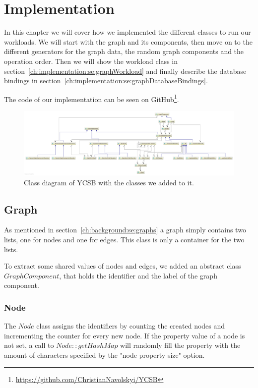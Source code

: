 \chapter{Implementation}
\label{ch:implementation}
In this chapter we will cover how we implemented the different classes to run our workloads.
We will start with the graph and its components,
then move on to the different generators for the graph data,
the random graph components and the operation order.
Then we will show the workload class in section~\ref{ch:implementation:se:graphWorkload} and finally describe the database bindings in section~\ref{ch:implementation:se:graphDatabaseBindings}.

The code of our implementation can be seen on GitHub\footnote{\url{https://github.com/ChristianNavolskyi/YCSB}}.


\begin{figure}
  \includegraphics[width=\textwidth]{images/benchmarks/extendedYCSBWorkflow}
  \caption{Class diagram of YCSB with the classes we added to it. }
  \label{fig:YCSBExtension}
\end{figure}

\section{Graph}
As mentioned in section~\ref{ch:background:se:graphs} a graph simply contains two lists,
one for nodes and one for edges.
This class is only a container for the two lists.

To extract some shared values of nodes and edges,
we added an abstract class $ GraphComponent $,
that holds the identifier and the label of the graph component.

\subsection{Node}
The $ Node $ class assigns the identifiers by counting the created nodes and incrementing the counter for every new node.
If the property value of a node is not set,
a call to $ Node::getHashMap $ will randomly fill the property with the amount of characters specified by the "node property size" option.

